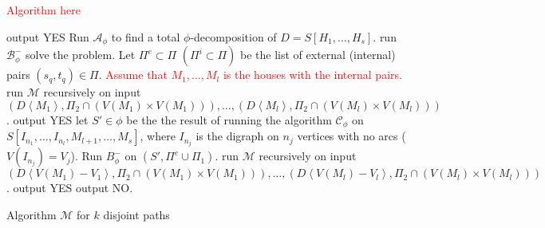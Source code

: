 \textcolor{red}{Algorithm here}
\begin{algorithm}
    \begin{algorithmic}[1]
        \IF{$\Pi=\emptyset$}
            \STATE output YES
        \ENDIF
        \STATE Run $\mathcal{A}_{\phi}$ to find a total $\phi$-decomposition of $D=S[H_1,\dots,H_s]$.
            \STATE run $\mathcal{B}^-_{\phi}$ solve the problem.
        \ENDIF
        \STATE Let $\Pi^e\subset \Pi$ $(\Pi^i\subset \Pi)$ be the list of external (internal) pairs $(s_q,t_q)\in \Pi$.
        \STATE \textcolor{red}{Assume that $M_1,\dots , M_l$ is the houses with the internal pairs.}
             \label{state 3a}
                \STATE run $\mathcal{M}$ recursively on input $(D\left<M_1\right>, \Pi_2\cap (V(M_1)\times V(M_1))) , \dots ,(D\left<M_l\right>, \Pi_2\cap (V(M_l)\times V(M_l)))$.
                    \STATE output YES
                \ENDIF
            \ENDIF
             \label{state 3b}
                    \STATE let $S'\in \phi$ be the the result of running the algorithm $\mathcal{C}_\phi$ on $S[I_{n_1},\dots,I_{n_l},M_{l+1},\dots , M_s]$, where $I_{n_j}$ is the digraph on $n_j$ vertices with no arcs ($V(I_{n_j})=V_j$).            
                    \STATE Run $B_{\phi}^-$ on $(S',\Pi^e\cup\Pi_1)$.
                        \STATE run $\mathcal{M}$ recursively on input $(D\left<V(M_1)-V_1\right>, \Pi_2\cap (V(M_1)\times V(M_1))) , \dots ,(D\left<V(M_l)-V_l\right>, \Pi_2\cap (V(M_l)\times V(M_l)))$.
                    \ENDIF 
                        \STATE output YES
                    \ENDIF
                \ENDFOR
            \ENDIF
        \ENDFOR 
            \STATE output NO.
        \ENDIF
    \end{algorithmic}
    \caption{Algorithm $\mathcal{M}$ for $k$ disjoint paths}
    \label{alg:phi}
\end{algorithm}
